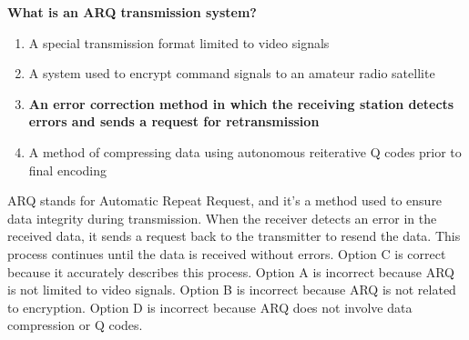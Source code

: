 \begin{tcolorbox}[colback=gray!10!white,colframe=black!75!black,title={T8D11}]
    \textbf{What is an ARQ transmission system?}
    \begin{enumerate}[label=\Alph*),noitemsep]
        \item A special transmission format limited to video signals
        \item A system used to encrypt command signals to an amateur radio satellite
        \item \textbf{An error correction method in which the receiving station detects errors and sends a request for retransmission}
        \item A method of compressing data using autonomous reiterative Q codes prior to final encoding
    \end{enumerate}
\end{tcolorbox}

ARQ stands for Automatic Repeat Request, and it's a method used to ensure data integrity during transmission. When the receiver detects an error in the received data, it sends a request back to the transmitter to resend the data. This process continues until the data is received without errors. Option C is correct because it accurately describes this process. Option A is incorrect because ARQ is not limited to video signals. Option B is incorrect because ARQ is not related to encryption. Option D is incorrect because ARQ does not involve data compression or Q codes.
